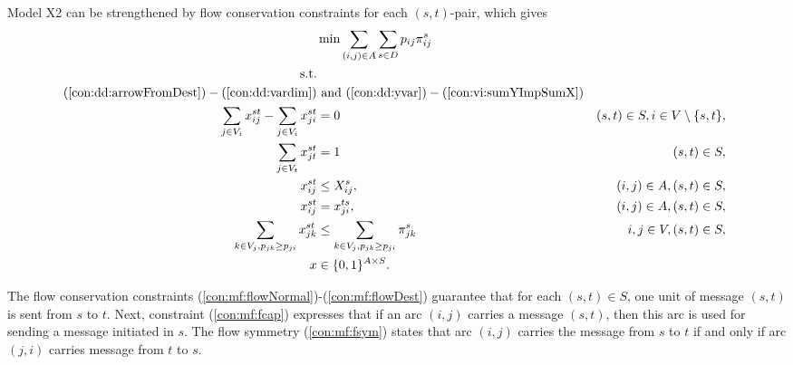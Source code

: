 Model X2 can be strengthened by flow conservation constraints for each $(s,t)$-pair, which gives 
\newline
\newline
\begin{subequations}\label{eq:smt-x2}
\begin{align}
\label{objective:mf} \makebox[0pt][l]{$\displaystyle{} \min \sum\limits_{(i,j) \in A} \sum\limits_{s \in D} p_{ij} \pi^s_{ij} $}\\
\text{s.t.} \notag \\
(\ref{con:dd:arrowFromDest}) - (\ref{con:dd:vardim}) &\text{ and }(\ref{con:dd:yvar}) - (\ref{con:vi:sumYImpSumX}) \notag\\
\label{con:mf:flowNormal} \sum\limits_{\substack{ j\in V_i}}x^{st}_{ij}-\sum\limits_{\substack{j\in V_i }}x^{st}_{ji} & = 0 & (s,t)\in S, i\in V\setminus\{s,t\},\\
\label{con:mf:flowDest} \sum\limits_{\substack{j\in V_t}}x^{st}_{jt}    & = 1  & (s,t)\in S,\\
\label{con:mf:fcap} x^{st}_{ij} &\leq X^{s}_{ij},& (i,j)\in A, (s,t)\in S,\\
\label{con:mf:fsym} x^{st}_{ij} &=  x^{ts}_{ji},& (i,j)\in A, (s,t)\in S,\\ 
\label{con:vi:sumFImpSumY} \sum\limits_{k\in V_j, p_{jk}\geq p_{ji}}x^{st}_{jk} & \leq \sum\limits_{k\in V_j, p_{jk}\geq p_{ji}}  \pi^{s}_{jk} & i,j\in V, (s,t)\in S,\\
\label{con:mf:xydim} x&\in\{0,1\}^{A\times S}. 
\end{align}~
\end{subequations}

The flow conservation constraints (\ref{con:mf:flowNormal})-(\ref{con:mf:flowDest}) guarantee that for each $(s,t)\in S$, one unit of message $(s,t)$ is sent from $s$ to $t$.
Next, constraint (\ref{con:mf:fcap}) expresses that if an arc $(i,j)$ carries a message $(s,t)$, then this arc is used for sending a message initiated in $s$.
The flow symmetry (\ref{con:mf:fsym}) states that arc $(i,j)$ carries the message from $s$ to $t$ if and only if arc $(j,i)$ carries message from $t$ to $s$.

